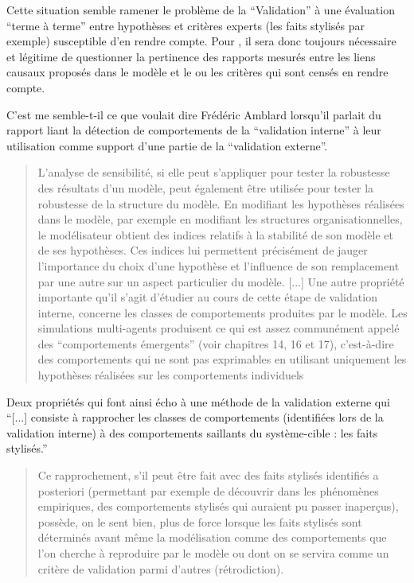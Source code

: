 Cette situation semble ramener le problème de la \enquote{Validation} à une évaluation \enquote{terme à terme} entre hypothèses et critères experts (les faits stylisés par exemple) susceptible d'en rendre compte. Pour \textcite{Bulle2005}, il sera donc toujours nécessaire et légitime de questionner la pertinence des rapports mesurés entre les liens causaux proposés dans le modèle et le ou les critères qui sont censés en rendre compte.

C’est me semble-t-il ce que voulait dire Frédéric Amblard \textcite{Amblard2006} lorsqu’il parlait du rapport liant la détection de comportements de la \enquote{validation interne} à leur utilisation comme support d’une partie de la \enquote{validation externe}.

\blockquote[\cite{Amblard2006}]{L'analyse de sensibilité, si elle peut s'appliquer pour tester la robustesse des résultats d'un modèle, peut également être utilisée pour tester la robustesse de la structure du modèle. En modifiant les hypothèses réalisées dans le modèle, par exemple en modifiant les structures organisationnelles, le modélisateur obtient des indices relatifs à la stabilité de son modèle et de ses hypothèses. Ces indices lui permettent précisément de jauger l'importance du choix d’une hypothèse et l’influence de son remplacement par une autre sur un aspect particulier du modèle. [...] Une autre propriété importante qu'il s'agit d'étudier au cours de cette étape de validation interne, concerne les classes de comportements produites par le modèle. Les simulations multi-agents produisent ce qui est assez communément appelé des \enquote{comportements émergents}  (voir chapitres 14, 16 et 17), c'est-à-dire des comportements qui ne sont pas exprimables en utilisant uniquement les hypothèses réalisées sur les comportements individuels}.

Deux propriétés qui font ainsi écho à une méthode de la validation externe qui \enquote{[...] consiste à rapprocher les classes de comportements (identifiées lors de la validation interne) à des comportements saillants du système-cible : les faits stylisés.}

\blockquote[\cite{Amblard2006}]{Ce rapprochement, s’il peut être fait avec des faits stylisés identifiés a posteriori (permettant par exemple de découvrir dans les phénomènes empiriques, des comportements stylisés qui auraient pu passer inaperçus), possède, on le sent bien, plus de force lorsque les faits stylisés sont déterminés avant même la modélisation comme des comportements que l'on cherche à reproduire par le modèle ou dont on se servira comme un critère de validation parmi d'autres (rétrodiction).}


